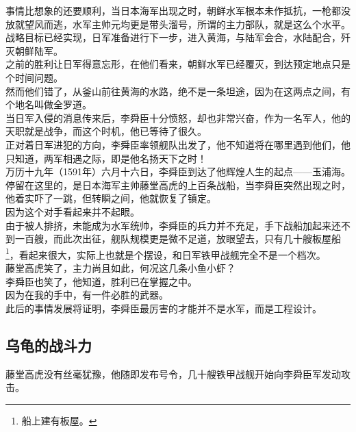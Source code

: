 \begin{multicols}{\theparacolNo}
事情比想象的还要顺利，当日本海军出现之时，朝鲜水军根本未作抵抗，一枪都没放就望风而逃，水军主帅元均更是带头溜号，所谓的主力部队，就是这么个水平。\\

战略目标已经实现，日军准备进行下一步，进入黄海，与陆军会合，水陆配合，歼灭朝鲜陆军。\\

之前的胜利让日军得意忘形，在他们看来，朝鲜水军已经覆灭，到达预定地点只是个时间问题。\\

然而他们错了，从釜山前往黄海的水路，绝不是一条坦途，因为在这两点之间，有个地名叫做全罗道。\\

当日军入侵的消息传来后，李舜臣十分愤怒，却也非常兴奋，作为一名军人，他的天职就是战争，而这个时机，他已等待了很久。\\

正对着日军进犯的方向，李舜臣率领舰队出发了，他不知道将在哪里遇到他们，他只知道，两军相遇之际，即是他名扬天下之时！\\

万历十九年（1591年）六月十六日，李舜臣到达了他辉煌人生的起点——玉浦海。\\

停留在这里的，是日本海军主帅藤堂高虎的上百条战船，当李舜臣突然出现之时，他着实吓了一跳，但转瞬之间，他就恢复了镇定。\\

因为这个对手看起来并不起眼。\\

由于被人排挤，未能成为水军统帅，李舜臣的兵力并不充足，手下战船加起来还不到一百艘，而此次出征，舰队规模更是微不足道，放眼望去，只有几十艘板屋船\footnote{船上建有板屋。}，看起来很大，实际上也就是个摆设，和日军铁甲战舰完全不是一个档次。\\

藤堂高虎笑了，主力尚且如此，何况这几条小鱼小虾？\\

李舜臣也笑了，他知道，胜利已在掌握之中。\\

因为在我的手中，有一件必胜的武器。\\

此后的事情发展将证明，李舜臣最厉害的才能并不是水军，而是工程设计。\\

\subsection{乌龟的战斗力}
藤堂高虎没有丝毫犹豫，他随即发布号令，几十艘铁甲战舰开始向李舜臣军发动攻击。\\


\end{multicols}
